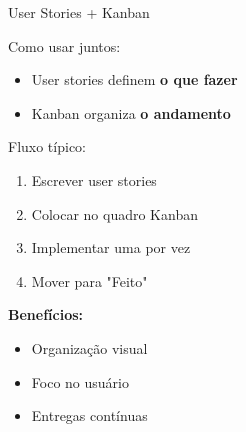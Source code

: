 \documentclass{beamer}
\begin{document}
\begin{frame}{User Stories + Kanban}
    
    Como usar juntos:
    
    \vspace{0.3cm}
    
    \begin{itemize}
        \item User stories definem \textbf{o que fazer}
        \item Kanban organiza \textbf{o andamento}
    \end{itemize}
    
    \vspace{0.4cm}
    
    Fluxo típico:
    
    \begin{enumerate}
        \item Escrever user stories
        \item Colocar no quadro Kanban
        \item Implementar uma por vez
        \item Mover para "Feito"
    \end{enumerate}
    
    \vspace{0.4cm}
    
    \textbf{Benefícios:}
    
    \begin{itemize}
        \item Organização visual
        \item Foco no usuário
        \item Entregas contínuas
    \end{itemize}
    
\end{frame}
\end{document}
